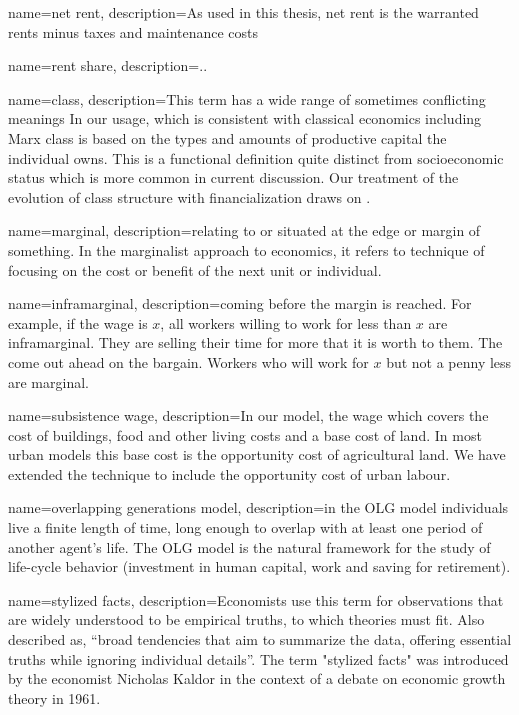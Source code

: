{
name=net rent,
description={As used in this thesis, net rent is the warranted rents minus taxes and maintenance costs }
}

{
name=rent share,
description={..}
}


{
name=class,
description={This term has a wide range of sometimes conflicting meanings In our usage, which is consistent with classical economics including Marx class is based on the types and amounts of productive capital the individual owns. This is a functional definition quite distinct from socioeconomic status which is more common in current discussion. Our treatment of the evolution of class structure with financialization draws on \cite{roemerGeneralTheoryExploitation1982}.}
}

{
name=marginal,
description={relating to or situated at the edge or margin of something. In the marginalist approach to economics, it  refers to technique of focusing on the cost or benefit of the next unit or individual.}
}

{
name=inframarginal,
description={coming before the margin is reached. For example, if the wage is $x$, all workers willing to work for less than $x$ are inframarginal. They are selling their time for more that it is worth to them. The come out ahead on the bargain. Workers who will work for $x$ but not a penny less are marginal. }
}

{
name=subsistence wage,
description={In our model, the wage which covers the cost of buildings, food and other living costs and a base cost of land. In most urban models this base cost is  the opportunity cost of agricultural land. We have extended the technique to include the opportunity cost of urban labour. }
}

{
name=overlapping generations model,
description={in the OLG model individuals live a finite length of time, long enough to overlap with at least one period of another agent's life. The OLG model is the natural framework for the study of life-cycle behavior (investment in human capital, work and saving for retirement).}
}

{
name=stylized facts,
description={Economists use this term for observations that are widely understood to be empirical truths, to which theories must fit.  Also described as, ``broad tendencies that aim to summarize the data, offering essential truths while ignoring individual details''. The term "stylized facts" was introduced by the economist Nicholas Kaldor in the context of a debate on economic growth theory in 1961.\cite{kaldorCapitalAccumulationEconomic1961}}
}

